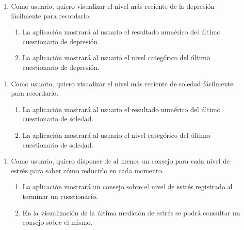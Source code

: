         \begin{enumerate}[resume=req-usuario,label=\textbf{\texttt{RU-\arabic*}}]
            \item Como usuario, quiero visualizar el nivel más reciente de la depresión fácilmente para recordarlo.
            \begin{enumerate}[resume=req-funcionales,label=\textbf{\texttt{RF-\arabic*}}]
                \item La aplicación mostrará al usuario el resultado numérico del último cuestionario de depresión.
                \item La aplicación mostrará al usuario el nivel categórico del último cuestionario de depresión.
            \end{enumerate}
        \end{enumerate}
        \begin{enumerate}[resume=req-usuario,label=\textbf{\texttt{RU-\arabic*}}]
            \item Como usuario, quiero visualizar el nivel más reciente de soledad fácilmente para recordarlo.
            \begin{enumerate}[resume=req-funcionales,label=\textbf{\texttt{RF-\arabic*}}]
                \item La aplicación mostrará al usuario el resultado numérico del último cuestionario de soledad.
                \item La aplicación mostrará al usuario el nivel categórico del último cuestionario de soledad.
            \end{enumerate}
        \end{enumerate}
        \begin{enumerate}[resume=req-usuario,label=\textbf{\texttt{RU-\arabic*}}]
            \item Como usuario, quiero disponer de al menos un consejo para cada nivel de estrés para saber cómo reducirlo en cada momento.
            \begin{enumerate}[resume=req-funcionales,label=\textbf{\texttt{RF-\arabic*}}]
                \item La aplicación mostrará un consejo sobre el nivel de estrés registrado al terminar un cuestionario.
                \item En la visualización de la última medición de estrés se podrá consultar un consejo sobre el mismo. 
            \end{enumerate}
        \end{enumerate}
